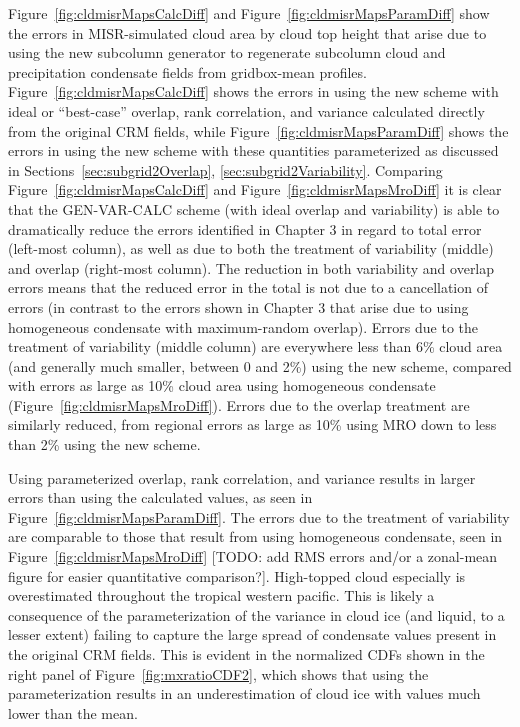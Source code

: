 Figure~\ref{fig:cldmisrMapsCalcDiff} and
Figure~\ref{fig:cldmisrMapsParamDiff} show the errors in MISR-simulated
cloud area by cloud top height that arise due to using the new subcolumn
generator to regenerate subcolumn cloud and precipitation condensate
fields from gridbox-mean profiles. Figure~\ref{fig:cldmisrMapsCalcDiff}
shows the errors in using the new scheme with ideal or ``best-case''
overlap, rank correlation, and variance calculated directly from the
original CRM fields, while Figure~\ref{fig:cldmisrMapsParamDiff} shows
the errors in using the new scheme with these quantities parameterized
as discussed in
Sections~\ref{sec:subgrid2Overlap}, \ref{sec:subgrid2Variability}.
Comparing Figure~\ref{fig:cldmisrMapsCalcDiff} and
Figure~\ref{fig:cldmisrMapsMroDiff} it is clear that the GEN-VAR-CALC
scheme (with ideal overlap and variability) is able to dramatically
reduce the errors identified in Chapter 3 in regard to total error
(left-most column), as well as due to both the treatment of variability
(middle) and overlap (right-most column). The reduction in both
variability and overlap errors means that the reduced error in the total
is not due to a cancellation of errors (in contrast to the errors shown
in Chapter 3 that arise due to using homogeneous condensate with
maximum-random overlap). Errors due to the treatment of variability
(middle column) are everywhere less than 6\% cloud area (and generally
much smaller, between 0 and 2\%) using the new scheme, compared with
errors as large as 10\% cloud area using homogeneous condensate
(Figure~\ref{fig:cldmisrMapsMroDiff}). Errors due to the overlap
treatment are similarly reduced, from regional errors as large as 10\%
using MRO down to less than 2\% using the new scheme.

Using parameterized overlap, rank correlation, and variance results in
larger errors than using the calculated values, as seen in
Figure~\ref{fig:cldmisrMapsParamDiff}. The errors due to the treatment
of variability are comparable to those that result from using
homogeneous condensate, seen in Figure~\ref{fig:cldmisrMapsMroDiff}
{[}TODO: add RMS errors and/or a zonal-mean figure for easier
quantitative comparison?{]}. High-topped cloud especially is
overestimated throughout the tropical western pacific. This is likely a
consequence of the parameterization of the variance in cloud ice (and
liquid, to a lesser extent) failing to capture the large spread of
condensate values present in the original CRM fields. This is evident in
the normalized CDFs shown in the right panel of
Figure~\ref{fig:mxratioCDF2}, which shows that using the
parameterization results in an underestimation of cloud ice with values
much lower than the mean.

